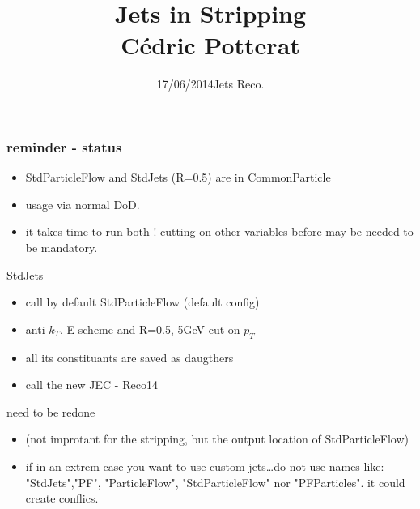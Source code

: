 \documentclass[compress,10pt]{beamer}
\title{\vspace{-1.0cm}Jets in Stripping\\
    \vspace{2.7cm}
    \small{C\'edric Potterat}
}
\author{\vspace{4.3cm}\scriptsize{17/06/2014}\hfill\small{{Jets Reco.}}}
\begin{document}

\maketitle




\begin{frame}
    \frametitle{reminder - status} 
    \begin{block}{}
        \begin{itemize}
            \item StdParticleFlow and StdJets  (R=0.5) are in CommonParticle 
            \item usage via normal DoD.
            \item it takes time to run both ! cutting on other variables before may be needed to be mandatory. 
        \end{itemize}
    \end{block}

     \begin{block}{StdJets}
        \begin{itemize}
            \item call by default StdParticleFlow (default config)
            \item anti-$k_T$, E scheme and R=0.5, 5GeV cut on $p_T$
            \item all its constituants are saved as daugthers
            \item call the new JEC - Reco14
        \end{itemize}
    \end{block}
    \begin{block}{need to be redone}
        \begin{itemize}
            \item (not improtant for the stripping, but the output location of StdParticleFlow)
            \item if in an extrem case you want to use custom jets\ldots do not use names like: "StdJets","PF", "ParticleFlow", "StdParticleFlow" nor "PFParticles". it could create conflics.
        \end{itemize}
    \end{block}
\end{frame}
\end{document}
